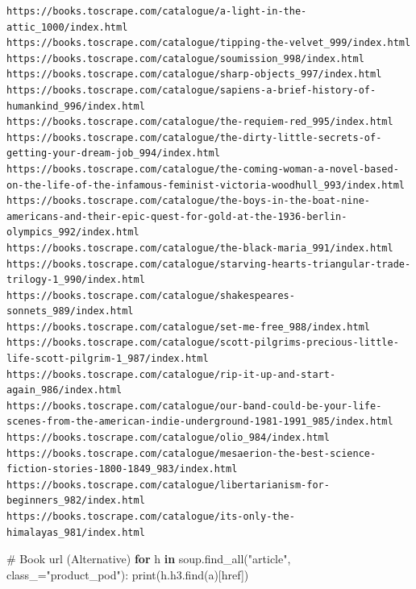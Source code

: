 \documentclass[
  letterpaper,
  DIV=11,
  numbers=noendperiod]{scrreprt}
\newenvironment{Shaded}{\begin{snugshade}}{\end{snugshade}}
\newcommand{\BuiltInTok}[1]{\textcolor[rgb]{0.00,0.23,0.31}{#1}}
\newcommand{\CommentTok}[1]{\textcolor[rgb]{0.37,0.37,0.37}{#1}}
\newcommand{\ControlFlowTok}[1]{\textcolor[rgb]{0.00,0.23,0.31}{\textbf{#1}}}
\newcommand{\KeywordTok}[1]{\textcolor[rgb]{0.00,0.23,0.31}{\textbf{#1}}}
\newcommand{\NormalTok}[1]{\textcolor[rgb]{0.00,0.23,0.31}{#1}}
\newcommand{\OperatorTok}[1]{\textcolor[rgb]{0.37,0.37,0.37}{#1}}
\newcommand{\StringTok}[1]{\textcolor[rgb]{0.13,0.47,0.30}{#1}}
\begin{document}
\begin{verbatim}
https://books.toscrape.com/catalogue/a-light-in-the-attic_1000/index.html
https://books.toscrape.com/catalogue/tipping-the-velvet_999/index.html
https://books.toscrape.com/catalogue/soumission_998/index.html
https://books.toscrape.com/catalogue/sharp-objects_997/index.html
https://books.toscrape.com/catalogue/sapiens-a-brief-history-of-humankind_996/index.html
https://books.toscrape.com/catalogue/the-requiem-red_995/index.html
https://books.toscrape.com/catalogue/the-dirty-little-secrets-of-getting-your-dream-job_994/index.html
https://books.toscrape.com/catalogue/the-coming-woman-a-novel-based-on-the-life-of-the-infamous-feminist-victoria-woodhull_993/index.html
https://books.toscrape.com/catalogue/the-boys-in-the-boat-nine-americans-and-their-epic-quest-for-gold-at-the-1936-berlin-olympics_992/index.html
https://books.toscrape.com/catalogue/the-black-maria_991/index.html
https://books.toscrape.com/catalogue/starving-hearts-triangular-trade-trilogy-1_990/index.html
https://books.toscrape.com/catalogue/shakespeares-sonnets_989/index.html
https://books.toscrape.com/catalogue/set-me-free_988/index.html
https://books.toscrape.com/catalogue/scott-pilgrims-precious-little-life-scott-pilgrim-1_987/index.html
https://books.toscrape.com/catalogue/rip-it-up-and-start-again_986/index.html
https://books.toscrape.com/catalogue/our-band-could-be-your-life-scenes-from-the-american-indie-underground-1981-1991_985/index.html
https://books.toscrape.com/catalogue/olio_984/index.html
https://books.toscrape.com/catalogue/mesaerion-the-best-science-fiction-stories-1800-1849_983/index.html
https://books.toscrape.com/catalogue/libertarianism-for-beginners_982/index.html
https://books.toscrape.com/catalogue/its-only-the-himalayas_981/index.html
\end{verbatim}

\begin{Shaded}
\begin{Highlighting}[]
\CommentTok{\# Book url (Alternative) }
\ControlFlowTok{for}\NormalTok{ h }\KeywordTok{in}\NormalTok{ soup.find\_all(}\StringTok{"article"}\NormalTok{, class\_}\OperatorTok{=}\StringTok{"product\_pod"}\NormalTok{):}
    \BuiltInTok{print}\NormalTok{(h.h3.find(}\StringTok{\textquotesingle{}a\textquotesingle{}}\NormalTok{)[}\StringTok{\textquotesingle{}href\textquotesingle{}}\NormalTok{])}
\end{Highlighting}
\end{Shaded}
\end{document}
